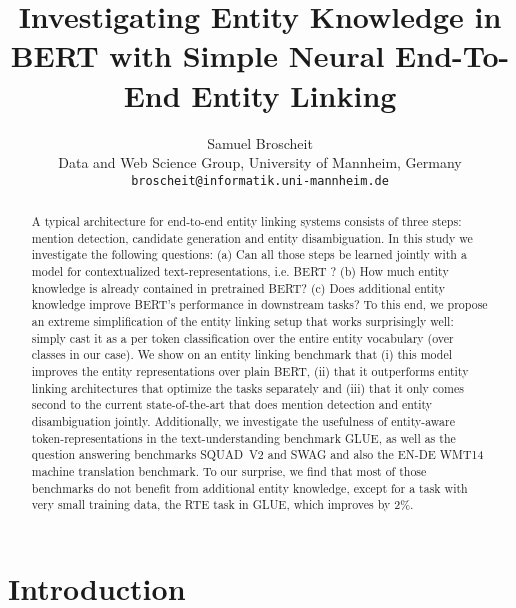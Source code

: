 \documentclass[11pt,a4paper]{article}
\title{Investigating Entity Knowledge in BERT with Simple Neural End-To-End Entity Linking}
\author{Samuel Broscheit \\
  Data and Web Science Group, University of Mannheim, Germany \\
  {\tt broscheit@informatik.uni-mannheim.de} \\}
\date{}
\begin{document}
\maketitle
\begin{abstract}
A typical architecture for end-to-end entity linking systems consists of three steps: mention detection, candidate generation and entity disambiguation. In this study we investigate the following questions: (a) Can all those steps be learned jointly with a model for contextualized text-representations, i.e. BERT  \citep{DBLP:conf/naacl/DevlinCLT19}? (b) How much entity knowledge is already contained in pretrained BERT? (c) Does additional entity knowledge improve BERT's performance in downstream tasks? To this end, we propose an extreme simplification of the entity linking setup that works surprisingly well: simply cast it as a per token classification over the entire entity vocabulary (over  classes in our case). We show on an entity linking benchmark that (i) this model improves the entity representations over plain BERT, (ii) that it outperforms entity linking architectures that optimize the tasks separately and (iii) that it only comes second to the current state-of-the-art that does mention detection and entity disambiguation jointly. Additionally, we investigate the usefulness of entity-aware token-representations in the text-understanding benchmark GLUE, as well as the question answering benchmarks SQUAD~V2 and SWAG and also the EN-DE WMT14 machine translation benchmark. To our surprise, we find that most of those benchmarks do not benefit from additional entity knowledge, except for a task with very small training data, the RTE task in GLUE, which improves by 2\%. 

\end{abstract}

\section{Introduction}
\end{document}
